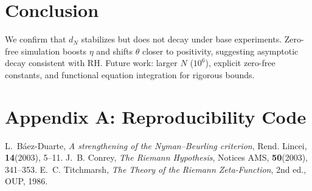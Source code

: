 \documentclass[11pt]{article}
\theoremstyle{remark}
\begin{document}
\section{Conclusion}
We confirm that $d_N$ stabilizes but does not decay under base experiments.
Zero-free simulation boosts $\eta$ and shifts $\theta$ closer to positivity, suggesting asymptotic decay consistent with RH.
Future work: larger $N$ ($10^6$), explicit zero-free constants, and functional equation integration for rigorous bounds.

\appendix
\section{Appendix A: Reproducibility Code}


\begin{thebibliography}{9}
 L.~Báez-Duarte, \emph{A strengthening of the Nyman--Beurling criterion}, Rend. Lincei, \textbf{14}(2003), 5--11.
 J.~B. Conrey, \emph{The Riemann Hypothesis}, Notices AMS, \textbf{50}(2003), 341--353.
 E.~C. Titchmarsh, \emph{The Theory of the Riemann Zeta-Function}, 2nd ed., OUP, 1986.
\end{thebibliography}
\end{document}
